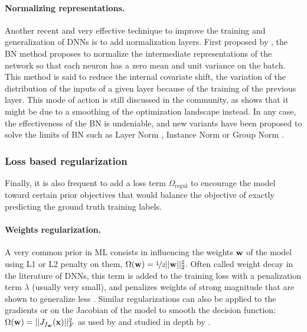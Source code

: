 \paragraph{Normalizing representations.} Another recent and very effective technique to improve the training and generalization of \acp{DNN} is to add normalization layers. First proposed by \citep{batchnorm}, the \acf{BN} method proposes to normalize the intermediate representations of the network so that each neuron has a zero mean and unit variance on the batch. This method is said to reduce the internal covariate shift, \ie the variation of the distribution of the inputs of a given layer because of the training of the previous layer. This mode of action is still discussed in the community, as \citet{santurkar2018does} shows that it might be due to a smoothing of the optimization landscape instead. In any case, the effectiveness of the \ac{BN} is undeniable, and new variants have been proposed to solve the limits of \ac{BN} such as Layer Norm \citep{lei2016layer}, Instance Norm \citep{ulyanov2016instance} or Group Norm \citep{wu2018group}.


\subsubsection{Loss based regularization} \label{shade:sec:RW_regul_loss}

Finally, it is also frequent to add a loss term $\Omega_\mathrm{regul}$ to encourage the model toward certain prior objectives that would balance the objective of exactly predicting the ground truth training labels.

\paragraph{Weights regularization.} A very common prior in \ac{ML} consists in influencing the weights $\mathbf{w}$ of the model using L1 or L2 penalty on them, \eg $\Omega(\mathbf{w}) = \nicefrac{1}{2}||\mathbf{w}||_2^2$. Often called weight decay in the literature of \acp{DNN}, this term is added to the training loss with a penalization term $\lambda$ (usually very small), and penalizes weights of strong magnitude that are shown to generalize less \citep{weightdecay}. Similar regularizations can also be applied to the gradients \citep{seck2019} or on the Jacobian of the model to smooth the decision function: $\Omega (\mathbf{w}) = ||J_{f_{\mathbf{w}}}(\mathbf{x})||_F^2$ as used by \citet{rifai2011contractive} and studied in depth by \citet{sokolic2017robust}.

